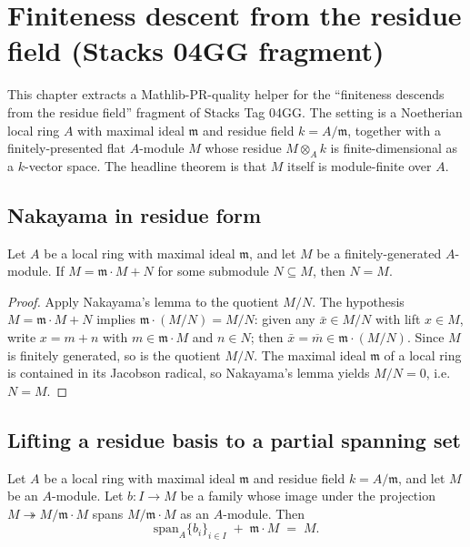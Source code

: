 \chapter{Finiteness descent from the residue field (Stacks 04GG fragment)}
\label{ch:Proetale_Mathlib_RingTheory_Module_FiniteResidue}

This chapter extracts a Mathlib-PR-quality helper for the
``finiteness descends from the residue field'' fragment of
Stacks Tag 04GG. The setting is a Noetherian local ring \(A\) with
maximal ideal \(\mathfrak{m}\) and residue field \(k = A/\mathfrak{m}\),
together with a finitely-presented flat \(A\)-module \(M\) whose
residue \(M \otimes_A k\) is finite-dimensional as a \(k\)-vector
space. The headline theorem is that \(M\) itself is module-finite
over \(A\).

\section{Nakayama in residue form}

\begin{lemma}
  \label{lem:nakayama-residue-spanning}
  Let \(A\) be a local ring with maximal ideal \(\mathfrak{m}\), and
  let \(M\) be a finitely-generated \(A\)-module. If
  \(M = \mathfrak{m} \cdot M + N\) for some submodule
  \(N \subseteq M\), then \(N = M\).
\end{lemma}

\begin{proof}
  \leanok
  Apply Nakayama's lemma to the quotient \(M/N\). The hypothesis
  \(M = \mathfrak{m} \cdot M + N\) implies
  \(\mathfrak{m} \cdot (M/N) = M/N\): given any \(\bar x \in M/N\)
  with lift \(x \in M\), write \(x = m + n\) with \(m \in
  \mathfrak{m} \cdot M\) and \(n \in N\); then
  \(\bar x = \overline{m} \in \mathfrak{m} \cdot (M/N)\). Since
  \(M\) is finitely generated, so is the quotient \(M/N\). The
  maximal ideal \(\mathfrak{m}\) of a local ring is contained in
  its Jacobson radical, so Nakayama's lemma yields \(M/N = 0\),
  i.e.\ \(N = M\).
\end{proof}

\section{Lifting a residue basis to a partial spanning set}

\begin{lemma}
  \label{lem:lift-residue-basis-to-spanning}
  Let \(A\) be a local ring with maximal ideal \(\mathfrak{m}\)
  and residue field \(k = A/\mathfrak{m}\), and let \(M\) be an
  \(A\)-module. Let \(b : I \to M\) be a family whose image under
  the projection \(M \twoheadrightarrow M / \mathfrak{m} \cdot M\)
  spans \(M / \mathfrak{m} \cdot M\) as an \(A\)-module. Then
  \[
    \mathrm{span}_A \{b_i\}_{i \in I} \;+\; \mathfrak{m} \cdot M
    \;=\; M.
  \]
\end{lemma}

